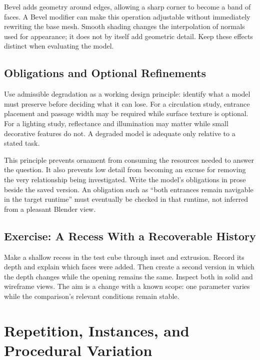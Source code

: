 \documentclass[11pt,openany]{book}
\begin{document}
Bevel adds geometry around edges, allowing a sharp corner to become a band of faces. A Bevel modifier can make this operation adjustable without immediately rewriting the base mesh. Smooth shading changes the interpolation of normals used for appearance; it does not by itself add geometric detail. Keep these effects distinct when evaluating the model.

\section{Obligations and Optional Refinements}

Use admissible degradation as a working design principle: identify what a model must preserve before deciding what it can lose. For a circulation study, entrance placement and passage width may be required while surface texture is optional. For a lighting study, reflectance and illumination may matter while small decorative features do not. A degraded model is adequate only relative to a stated task.

This principle prevents ornament from consuming the resources needed to answer the question. It also prevents low detail from becoming an excuse for removing the very relationship being investigated. Write the model's obligations in prose beside the saved version. An obligation such as ``both entrances remain navigable in the target runtime'' must eventually be checked in that runtime, not inferred from a pleasant Blender view.

\section{Exercise: A Recess With a Recoverable History}

\begin{exercise}[4.4: A recess]
Make a shallow recess in the test cube through inset and extrusion. Record its depth and explain which faces were added. Then create a second version in which the depth changes while the opening remains the same. Inspect both in solid and wireframe views. The aim is a change with a known scope: one parameter varies while the comparison's relevant conditions remain stable.
\end{exercise}



\chapter{Repetition, Instances, and Procedural Variation}
\end{document}
